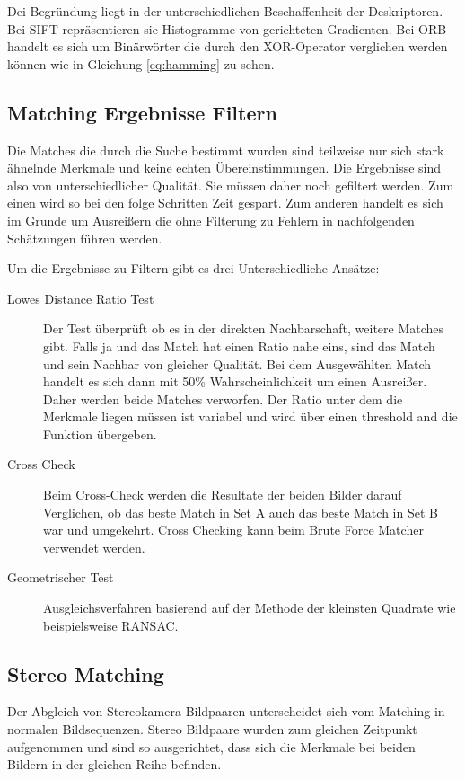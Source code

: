 Dei Begründung liegt in der unterschiedlichen Beschaffenheit der Deskriptoren. Bei SIFT repräsentieren sie Histogramme von gerichteten Gradienten. Bei ORB handelt es sich um Binärwörter die durch den XOR-Operator verglichen werden können wie in Gleichung \ref{eq:hamming} zu sehen. 

\subsection{Matching Ergebnisse Filtern}
Die Matches die durch die Suche bestimmt wurden sind teilweise nur sich stark ähnelnde Merkmale und keine echten Übereinstimmungen. Die Ergebnisse sind also von unterschiedlicher Qualität. Sie müssen daher noch gefiltert werden. Zum einen wird so bei den folge Schritten Zeit gespart. Zum anderen handelt es sich im Grunde um Ausrei{\ss}ern die ohne Filterung zu Fehlern in nachfolgenden Schätzungen führen werden.

Um die Ergebnisse zu Filtern gibt es drei Unterschiedliche Ansätze:

\begin{description}
  \item[Lowes Distance Ratio Test] Der Test überprüft ob es in der direkten Nachbarschaft, weitere Matches gibt. Falls ja und das Match hat einen Ratio nahe eins, sind das Match und sein Nachbar von gleicher Qualität. Bei dem Ausgewählten Match handelt es sich dann mit 50\% Wahrscheinlichkeit um einen Ausrei{\ss}er. Daher werden beide Matches verworfen. Der Ratio unter dem die Merkmale liegen müssen ist variabel und wird über einen threshold and die Funktion übergeben. \cite{Lowe04distinctiveimage} 
  \item[Cross Check] Beim Cross-Check werden die Resultate der beiden Bilder darauf Verglichen, ob das beste Match in Set A auch das beste Match in Set B war und umgekehrt. Cross Checking kann beim Brute Force Matcher verwendet werden. 
  \item[Geometrischer Test] Ausgleichsverfahren basierend auf der Methode der kleinsten Quadrate wie beispielsweise RANSAC. 
\end{description}

\subsection{Stereo Matching}
Der Abgleich von Stereokamera Bildpaaren unterscheidet sich vom Matching in normalen Bildsequenzen. Stereo Bildpaare wurden zum gleichen Zeitpunkt aufgenommen und sind so ausgerichtet, dass sich die Merkmale bei beiden Bildern in der gleichen Reihe befinden.


